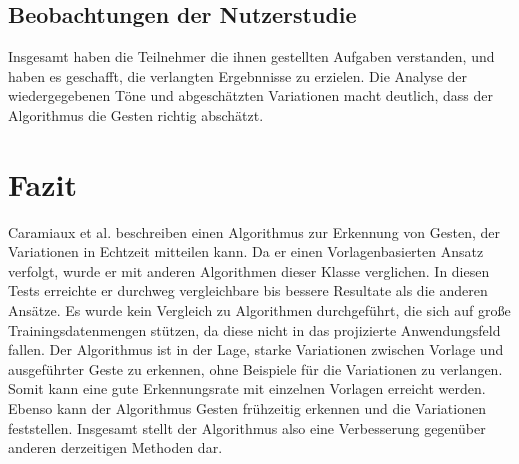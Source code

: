 \documentclass{llncs}
\begin{document}
\subsection{Beobachtungen der Nutzerstudie}
Insgesamt haben die Teilnehmer die ihnen gestellten Aufgaben verstanden, und haben es geschafft, die verlangten Ergebnnisse zu erzielen. Die Analyse der wiedergegebenen Töne und abgeschätzten Variationen macht deutlich, dass der Algorithmus die Gesten richtig abschätzt.

\section{Fazit}
Caramiaux et al.\cite{Caramiaux2014} beschreiben einen Algorithmus zur Erkennung von Gesten, der Variationen in Echtzeit mitteilen kann. Da er einen Vorlagenbasierten Ansatz verfolgt, wurde er mit anderen Algorithmen dieser Klasse verglichen. In diesen Tests erreichte er durchweg vergleichbare bis bessere Resultate als die anderen Ansätze. Es wurde kein Vergleich zu Algorithmen durchgeführt, die sich auf große Trainingsdatenmengen stützen, da diese nicht in das projizierte Anwendungsfeld fallen. Der Algorithmus ist in der Lage, starke Variationen zwischen Vorlage und ausgeführter Geste zu erkennen, ohne Beispiele für die Variationen zu verlangen. Somit kann eine gute Erkennungsrate mit einzelnen Vorlagen erreicht werden. Ebenso kann der Algorithmus Gesten frühzeitig erkennen und die Variationen feststellen. Insgesamt stellt der Algorithmus also eine Verbesserung gegenüber anderen derzeitigen Methoden dar.
 


\end{document}
